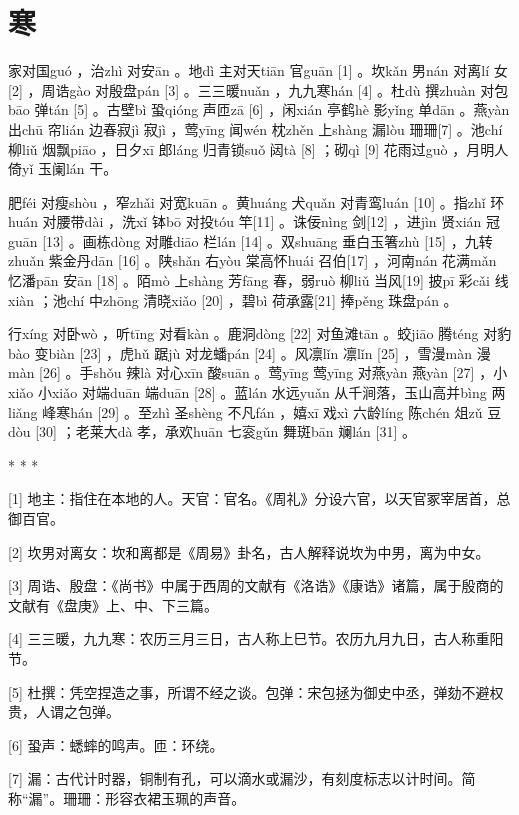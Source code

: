 \documentclass[12pt,UTF8]{ctexbook}
\begin{document}
\chapter{寒}


家对国guó ，治zhì 对安ān 。地dì 主对天tiān 官guān [1] 。坎kǎn 男nán 对离lí 女[2] ，周诰gào 对殷盘pán [3] 。三三暖nuǎn ，九九寒hán [4] 。杜dù 撰zhuàn 对包bāo 弹tán [5] 。古壁bì 蛩qióng 声匝zā [6] ，闲xián 亭鹤hè 影yǐng 单dān 。燕yàn 出chū 帘lián 边春寂jì 寂jì ，莺yīng 闻wén 枕zhěn 上shàng 漏lòu 珊珊[7] 。池chí 柳liǔ 烟飘piāo ，日夕xī 郎láng 归青锁suǒ 闼tà [8] ；砌qì [9] 花雨过guò ，月明人倚yǐ 玉阑lán 干。

肥féi 对瘦shòu ，窄zhǎi 对宽kuān 。黄huáng 犬quǎn 对青鸾luán [10] 。指zhǐ 环huán 对腰带dài ，洗xǐ 钵bō 对投tóu 竿[11] 。诛佞nìng 剑[12] ，进jìn 贤xián 冠guān [13] 。画栋dòng 对雕diāo 栏lán [14] 。双shuāng 垂白玉箸zhù [15] ，九转zhuǎn 紫金丹dān [16] 。陕shǎn 右yòu 棠高怀huái 召伯[17] ，河南nán 花满mǎn 忆潘pān 安ān [18] 。陌mò 上shàng 芳fāng 春，弱ruò 柳liǔ 当风[19] 披pī 彩cǎi 线xiàn ；池chí 中zhōng 清晓xiǎo [20] ，碧bì 荷承露[21] 捧pěng 珠盘pán 。

行xíng 对卧wò ，听tīng 对看kàn 。鹿洞dòng [22] 对鱼滩tān 。蛟jiāo 腾téng 对豹bào 变biàn [23] ，虎hǔ 踞jù 对龙蟠pán [24] 。风凛lǐn 凛lǐn [25] ，雪漫màn 漫màn [26] 。手shǒu 辣là 对心xīn 酸suān 。莺yīng 莺yīng 对燕yàn 燕yàn [27] ，小xiǎo 小xiǎo 对端duān 端duān [28] 。蓝lán 水远yuǎn 从千涧落，玉山高并bìng 两liǎng 峰寒hán [29] 。至zhì 圣shèng 不凡fán ，嬉xī 戏xì 六龄líng 陈chén 俎zǔ 豆dòu [30] ；老莱大dà 孝，承欢huān 七衮gǔn 舞斑bān 斓lán [31] 。



* * *



[1] 地主：指住在本地的人。天官：官名。《周礼》分设六官，以天官冢宰居首，总御百官。

[2] 坎男对离女：坎和离都是《周易》卦名，古人解释说坎为中男，离为中女。

[3] 周诰、殷盘：《尚书》中属于西周的文献有《洛诰》《康诰》诸篇，属于殷商的文献有《盘庚》上、中、下三篇。

[4] 三三暖，九九寒：农历三月三日，古人称上巳节。农历九月九日，古人称重阳节。

[5] 杜撰：凭空捏造之事，所谓不经之谈。包弹：宋包拯为御史中丞，弹劾不避权贵，人谓之包弹。

[6] 蛩声：蟋蟀的鸣声。匝：环绕。

[7] 漏：古代计时器，铜制有孔，可以滴水或漏沙，有刻度标志以计时间。简称“漏”。珊珊：形容衣裙玉珮的声音。
\end{document}
